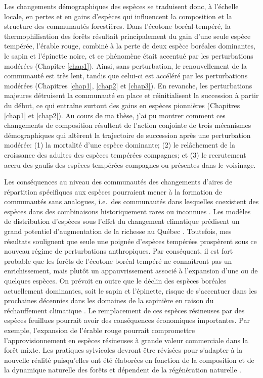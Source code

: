 Les changements démographiques des espèces se traduisent donc, à
l'échelle locale, en pertes et en gains d'espèces qui influencent la
composition et la structure des communautés forestières. Dans l'écotone
boréal-tempéré, la thermophilisation des forêts résultait principalement
du gain d'une seule espèce tempérée, l'érable rouge, combiné à la perte
de deux espèce boréales dominantes, le sapin et l'épinette noire, et ce
phénomène était accentué par les perturbations modérées (Chapitre
\ref{chap1}). Ainsi, sans perturbation, le renouvellement de la
communauté est très lent, tandis que celui-ci est accéléré par les
perturbations modérées (Chapitres \ref{chap1}, \ref{chap2} et
\ref{chap3}). En revanche, les perturbations majeures détruisent la
communauté en place et réinitialisent la succession à partir du début,
ce qui entraîne surtout des gains en espèces pionnières (Chapitres
\ref{chap1} et \ref{chap2}). Au cours de ma thèse, j'ai pu montrer
comment ces changements de composition résultent de l'action conjointe
de trois mécanismes démographiques qui altèrent la trajectoire de
succession après une perturbation modérée: (1) la mortalité d'une espèce
dominante; (2) le relâchement de la croissance des adultes des espèces
tempérées compagnes; et (3) le recrutement accru des gaulis des espèces
tempérées compagnes ou présentes dans le voisinage.

Les conséquences au niveau des communautés des changements d'aires de
répartition spécifiques aux espèces pourraient mener à la formation de
communautés sans analogues, i.e.~des communautés dans lesquelles
coexistent des espèces dans des combinaisons historiquement rares ou
inconnues \citep{williams_novel_2007}. Les modèles de distribution
d'espèces sous l'effet du changement climatique prédisent un grand
potentiel d'augmentation de la richesse au Québec
\citep{berteaux_changements_2014}. Toutefois, mes résultats soulignent
que seule une poignée d'espèces tempérées prospèrent sous ce nouveau
régime de perturbations anthropiques. Par conséquent, il est fort
probable que les forêts de l'écotone boréal-tempéré ne connaîtront pas
un enrichissement, mais plutôt un appauvrissement associé à l'expansion
d'une ou de quelques espèces. On prévoit en outre que le déclin des
espèces boréales actuellement dominantes, soit le sapin et l'épinette,
risque de s'accentuer dans les prochaines décennies dans les domaines de
la sapinière en raison du réchauffement climatique
\citep{dorangeville_beneficial_2018}. Le remplacement de ces espèces
résineuses par des espèces feuillues pourrait avoir des conséquences
économiques importantes. Par exemple, l'expansion de l'érable rouge
pourrait compromettre l'approvisionnement en espèces résineuses à grande
valeur commerciale dans la forêt mixte. Les pratiques sylvicoles devront
être révisées pour s'adapter à la nouvelle réalité puisqu'elles ont été
élaborées en fonction de la composition et de la dynamique naturelle des
forêts et dépendent de la régénération naturelle
\citep{pinna_amenagement_2009}.

